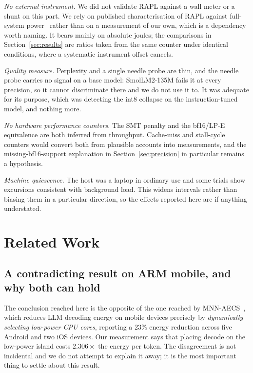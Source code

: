 \documentclass[journal]{IEEEtran}
\begin{document}
\emph{No external instrument.} We did not validate RAPL against a wall meter or
a shunt on this part. We rely on published characterisation of RAPL against
full-system power~\cite{khan2018rapl} rather than on a measurement of our own,
which is a dependency worth naming. It bears mainly on absolute joules; the
comparisons in Section~\ref{sec:results} are ratios taken from the same counter
under identical conditions, where a systematic instrument offset cancels.

\emph{Quality measure.} Perplexity and a single needle probe are thin, and the
needle probe carries no signal on a base model: SmolLM2-135M fails it at every
precision, so it cannot discriminate there and we do not use it to. It was
adequate for its purpose, which was detecting the int8 collapse on the
instruction-tuned model, and nothing more.

\emph{No hardware performance counters.} The SMT penalty and the bf16/LP-E
equivalence are both inferred from throughput. Cache-miss and stall-cycle
counters would convert both from plausible accounts into measurements, and the
missing-bf16-support explanation in Section~\ref{sec:precision} in particular
remains a hypothesis.

\emph{Machine quiescence.} The host was a laptop in ordinary use and some
trials show excursions consistent with background load. This widens intervals
rather than biasing them in a particular direction, so the effects reported
here are if anything understated.

\section{Related Work}

\subsection{A contradicting result on ARM mobile, and why both can hold}
\label{sec:contradiction}
The conclusion reached here is the opposite of the one reached by
MNN-AECS~\cite{mnn2025aecs}, which reduces LLM decoding energy on mobile
devices precisely by \emph{dynamically selecting low-power CPU cores}, reporting
a 23\% energy reduction across five Android and two iOS devices. Our measurement
says that placing decode on the low-power island costs $2.306\times$ the
energy per token. The disagreement is not incidental and we do not attempt to
explain it away; it is the most important thing to settle about this result.
\end{document}
